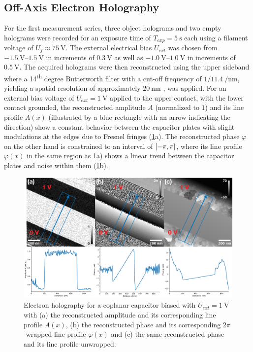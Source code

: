 \subsection{Off-Axis Electron Holography} \label{ssec:experimental-results-capacitor-EH}
For the first measurement series, three object holograms and two empty holograms were recorded for an exposure time of $T_{\mathit{exp}} = \SI{5}{\second}$ each using a filament voltage of $U_f \approx \SI{75}{\volt}$. The external electrical bias $U_{\mathit{ext}}$ was chosen from $\SIrange{-1.5}{1.5}{\volt}$ in increments of $\SI{0.3}{\volt}$ as well as $\SIrange{-1.0}{1.0}{\volt}$ in increments of $\SI{0.5}{\volt}$. The acquired holograms were then reconstructed using the upper sideband where a 14\textsuperscript{th} degree Butterworth filter with a cut-off frequency of $1/\SI[per-mode=power]{11.4}{\per\nm}$, yielding a spatial resolution of approximately $\SI{20}{\nm}$ \cite{Lehmann2002,Lichte2008}, was applied.
\newpage
For an external bias voltage of $U_{\mathit{ext}} = \SI{1}{\volt}$ applied to the upper contact, with the lower contact grounded, the reconstructed amplitude $A$ (normalized to $1$) and its line profile $A\left(x\right)$ (illustrated by a blue rectangle with an arrow indicating the direction) show a constant behavior between the capacitor plates with slight modulations at the edges due to Fresnel fringes (\cref{fig:capacitor-off-axis-EH-linescans}a). The reconstructed phase $\varphi$ on the other hand is constrained to an interval of $\interval{-\pi}{\pi}$, where its line profile $\varphi\left(x\right)$ in the same region as \cref{fig:capacitor-off-axis-EH-linescans}a) shows a linear trend between the capacitor plates and noise within them (\cref{fig:capacitor-off-axis-EH-linescans}b).
\begin{figure}[H]
	\centering
	\includegraphics[width=\textwidth]{Figures/Results/Capacitor/Holography/capacitor-off-axis-EH-linescans.pdf}
	\caption{Electron holography for a coplanar capacitor biased with $U_{\mathit{ext}} = \SI{1}{\volt}$ with (a) the reconstructed amplitude and its corresponding line profile $A\left(x\right)$, (b) the reconstructed phase and its corresponding $2\pi$-wrapped line profile $\varphi\left(x\right)$ and (c) the same reconstructed phase and its line profile unwrapped.}
	\label{fig:capacitor-off-axis-EH-linescans}
\end{figure}
